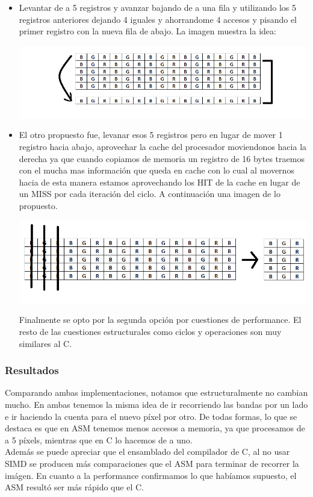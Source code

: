 \begin{itemize}
 \item Levantar de a 5 registros y avanzar bajando de a una fila y utilizando los 5 registros anteriores dejando 4 iguales y ahorrandome 4 accesos y pisando
el primer registro con la nueva fila de abajo. La imagen muestra la idea:
\begin{center}
 \includegraphics[scale=0.7]{imagenes/mover1.png}
\end{center}

\item El otro propuesto fue, levanar esos 5 registros pero en lugar de mover 1 registro hacia abajo, aprovechar la cache del procesador moviendonos hacia
la derecha ya que cuando copiamos de memoria un registro de 16 bytes traemos con el mucha mas informaci\'on que queda en cache con lo cual al movernos hacia
de esta manera estamos aprovechando los HIT de la cache en lugar de un MISS por cada iteraci\'on del ciclo. A continuaci\'on una imagen de lo propuesto.\newline
\begin{center}
 \includegraphics[scale=0.7]{imagenes/mover2.png}
\end{center}
Finalmente se opto por la segunda opci\'on por cuestiones de performance. El resto de las cuestiones estructurales como ciclos y operaciones son muy
similares al C.
\end{itemize}


\subsubsection{Resultados}
Comparando ambas implementaciones, notamos que estructuralmente no cambian mucho. En ambas tenemos la misma idea de ir recorriendo las bandas por un lado e ir haciendo la cuenta para el nuevo p\'ixel por otro. De todas formas, lo que se destaca es que en ASM tenemos menos accesos a memoria, ya que procesamos de a 5 p\'ixels, mientras que en C lo hacemos de a uno.\\
Adem\'as se puede apreciar que el ensamblado del compilador de C, al no usar SIMD se producen m\'as comparaciones que el ASM para terminar de recorrer la im\'agen.
En cuanto a la performance confirmamos lo que hab\'iamos supuesto, el ASM result\'o ser m\'as r\'apido que el C.\\

